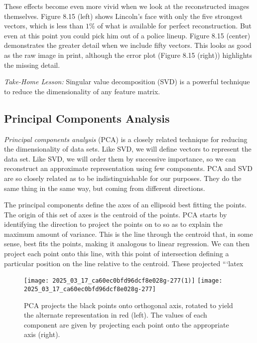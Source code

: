 \documentclass[10pt]{article}
\begin{document}
These effects become even more vivid when we look at the reconstructed images themselves. Figure 8.15 (left) shows Lincoln's face with only the five strongest vectors, which is less than \(1\%\) of what is available for perfect reconstruction. But even at this point you could pick him out of a police lineup. Figure 8.15 (center) demonstrates the greater detail when we include fifty vectors. This looks as good as the raw image in print, although the error plot (Figure 8.15 (right)) highlights the missing detail.

\textit{Take-Home Lesson:} Singular value decomposition (SVD) is a powerful technique to reduce the dimensionality of any feature matrix.

\subsection*{Principal Components Analysis}
\textit{Principal components analysis} (PCA) is a closely related technique for reducing the dimensionality of data sets. Like SVD, we will define vectors to represent the data set. Like SVD, we will order them by successive importance, so we can reconstruct an approximate representation using few components. PCA and SVD are so closely related as to be indistinguishable for our purposes. They do the same thing in the same way, but coming from different directions.

The principal components define the axes of an ellipsoid best fitting the points. The origin of this set of axes is the centroid of the points. PCA starts by identifying the direction to project the points on to so as to explain the maximum amount of variance. This is the line through the centroid that, in some sense, best fits the points, making it analogous to linear regression. We can then project each point onto this line, with this point of intersection defining a particular position on the line relative to the centroid. These projected  
```latex
\clearpage
\begin{figure}[H]
\centering
\texttt{[image: 2025\_03\_17\_ca60ec0bfd96dcf8e028g-277(1)]}
\texttt{[image: 2025\_03\_17\_ca60ec0bfd96dcf8e028g-277]}
\caption{PCA projects the black points onto orthogonal axis, rotated to yield the alternate representation in red (left). The values of each component are given by projecting each point onto the appropriate axis (right).}
\end{figure}
\end{document}
